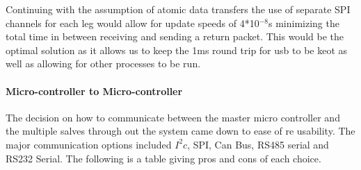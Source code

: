 		Continuing with the assumption of atomic data transfers the use of separate SPI channels for each leg would allow for update speeds of 4*10$^{-8}$s minimizing the total time in between receiving and sending a return packet. This would be the optimal solution as it allows us to keep the 1ms round trip for usb to be keot as well as allowing for other processes to be run.  
		
        \paragraph{Micro-controller to Micro-controller}
        The decision on how to communicate between the master micro controller and the multiple salves through out the system came down to ease of re usability. The major communication options included ${I^2c}$, SPI, Can Bus, RS485 serial and RS232 Serial. The following is a table giving pros and cons of each choice.
